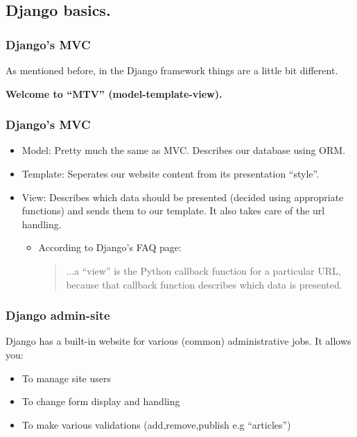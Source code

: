 \documentclass{beamer}
\begin{document}
\subsection{Django basics.}
\begin{frame}
  \frametitle{Django's MVC}
As mentioned before, in the Django framework things are a little bit different. 
\begin{center}
\textbf{Welcome to ``MTV'' (model-template-view).}
\end{center}
\end{frame}

\begin{frame}
  \frametitle{Django's MVC}
\begin{itemize}[<+->]
  \item Model: Pretty much the same as MVC. Describes our database using ORM.
  \item Template: Seperates our website content from its presentation ``style''.
  \item View: Describes which data should be presented (decided using appropriate functions) and sends them to our template. It also takes care of the url handling.
    \begin{itemize}
      \item According to Django's FAQ page: \begin{quote}...a “view” is the Python callback function for a particular URL, because that callback function describes which data is presented. \end{quote}
    \end{itemize}
\end{itemize}
\end{frame}

\begin{frame}
  \frametitle{Django admin-site}
Django has a built-in website for various (common) administrative jobs. It allows you:
\begin{itemize}
  \item To manage site users
  \item To change form display and handling
  \item To make various validations (add,remove,publish e.g ``articles'')
\end{itemize}
\end{frame}
\end{document}
